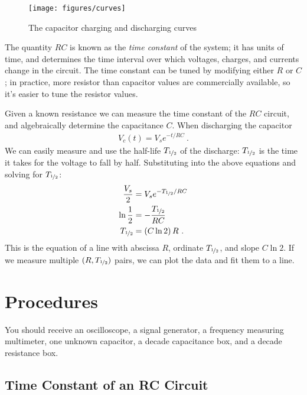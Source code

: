 \documentclass[12pt]{article}
\newcommand{\halflife}{\ensuremath{T_{\nicefrac{1}{2}}}\xspace}
\begin{document}
\begin{figure}
  \centering
  \texttt{[image: figures/curves]}
  \caption{The capacitor charging and discharging curves}
  \label{fig:curves}
\end{figure}
The quantity $RC$ is known as the \textit{time constant} of the
system; it has units of time, and determines the time interval over
which voltages, charges, and currents change in the circuit.  The time
constant can be tuned by modifying either $R$ or $C$; in practice,
more resistor than capacitor values are commercially available, so
it's easier to tune the resistor values.

Given a known resistance we can measure the time constant of the $RC$
circuit, and algebraically determine the capacitance $C$.  When
discharging the capacitor
\begin{gather*}
  V_c(t) = V_s e^{-t/RC}\ .
\end{gather*}
We can easily measure and use the half-life \halflife of the
discharge: \halflife is the time it takes for the voltage
to fall by half.  Substituting into the above equations and solving
for \halflife:
\begin{align*}
  \frac{V_s}{2} &= V_s e^{-\halflife/RC}\\
  \ln \frac{1}{2} &= -\frac{\halflife}{RC}\\
  \halflife &= \left(C \ln 2\right) R\ .
\end{align*}
This is the equation of a line with abscissa $R$, ordinate \halflife,
and slope $C \ln 2$.  If we measure multiple $(R, \halflife)$ pairs,
we can plot the data and fit them to a line.

\section{Procedures}
\label{sec:procedures}

You should receive an oscilloscope, a signal generator, a frequency
measuring multimeter, one unknown capacitor, a decade capacitance box,
and a decade resistance box.

\subsection{Time Constant of an RC Circuit}
\label{sec:timeconst}
\end{document}
